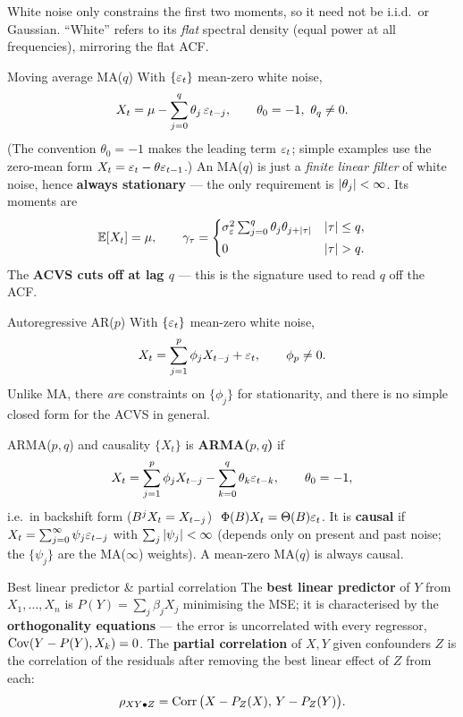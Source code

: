 \documentclass[11pt]{article}
\begin{document}
\begin{intu}
White noise only constrains the first two moments, so it need not be i.i.d.\ or Gaussian. ``White'' refers to its \emph{flat} spectral density (equal power at all frequencies), mirroring the flat ACF.
\end{intu}

\begin{defn}{Moving average MA($q$)}
With $\{\varepsilon_t\}$ mean-zero white noise,
\[
X_t=\mu-\sum_{j=0}^{q}\theta_j\,\varepsilon_{t-j},\qquad \theta_0=-1,\ \theta_q\ne0 .
\]
(The convention $\theta_0=-1$ makes the leading term $\varepsilon_t$; simple examples use the zero-mean form $X_t=\varepsilon_t-\theta\varepsilon_{t-1}$.) An MA($q$) is just a \emph{finite linear filter} of white noise, hence \textbf{always stationary} --- the only requirement is $\left\lvert \theta_j \right\rvert<\infty$. Its moments are
\[
\mathbb{E}[X_t]=\mu,\qquad
\gamma_\tau=
\begin{cases}
\sigma_\varepsilon^2\sum_{j=0}^{q}\theta_j\theta_{j+\left\lvert \tau \right\rvert} & \left\lvert \tau \right\rvert\le q,\\[1mm]
0 & \left\lvert \tau \right\rvert>q .
\end{cases}
\]
The \textbf{ACVS cuts off at lag $q$} --- this is the signature used to read $q$ off the ACF.
\end{defn}

\begin{defn}{Autoregressive AR($p$)}
With $\{\varepsilon_t\}$ mean-zero white noise,
\[
X_t=\sum_{j=1}^{p}\phi_j X_{t-j}+\varepsilon_t,\qquad \phi_p\ne0 .
\]
Unlike MA, there \emph{are} constraints on $\{\phi_j\}$ for stationarity, and there is no simple closed form for the ACVS in general.
\end{defn}

\begin{defn}{ARMA($p,q$) and causality}
$\{X_t\}$ is \textbf{ARMA($p,q$)} if
\[
X_t=\sum_{j=1}^{p}\phi_j X_{t-j}-\sum_{k=0}^{q}\theta_k\varepsilon_{t-k},\qquad \theta_0=-1,
\]
i.e.\ in backshift form ($B^jX_t=X_{t-j}$) $\ \Phi(B)X_t=\Theta(B)\varepsilon_t$. It is \textbf{causal} if $X_t=\sum_{j=0}^{\infty}\psi_j\varepsilon_{t-j}$ with $\sum_j\left\lvert \psi_j \right\rvert<\infty$ (depends only on present and past noise; the $\{\psi_j\}$ are the MA($\infty$) weights). A mean-zero MA($q$) is always causal.
\end{defn}

\begin{defn}{Best linear predictor \& partial correlation}
The \textbf{best linear predictor} of $Y$ from $X_1,\dots,X_n$ is $P(Y)=\sum_j\beta_jX_j$ minimising the MSE; it is characterised by the \textbf{orthogonality equations} --- the error is uncorrelated with every regressor, $\operatorname{Cov}(Y-P(Y),X_k)=0$. The \textbf{partial correlation} of $X,Y$ given confounders $Z$ is the correlation of the residuals after removing the best linear effect of $Z$ from each:
\[
\rho_{XY\bullet Z}=\operatorname{Corr}\big(X-P_Z(X),\,Y-P_Z(Y)\big).
\]
\end{defn}
\end{document}
